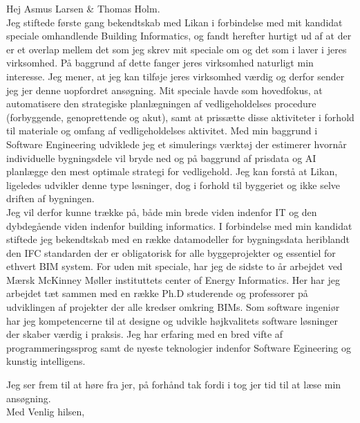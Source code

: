\documentclass[12pt,a4paper]{altacv}
\begin{document}
Hej Asmus Larsen \& Thomas Holm.
\\
\vspace{5mm}
Jeg stiftede første gang bekendtskab med Likan i forbindelse med mit kandidat speciale omhandlende Building Informatics, og fandt herefter hurtigt ud af at der er et overlap mellem det som jeg skrev mit speciale om og det som i laver i jeres virksomhed. 
På baggrund af dette fanger jeres virksomhed naturligt min interesse.
Jeg mener, at jeg kan tilføje jeres virksomhed værdig og derfor sender jeg jer denne uopfordret ansøgning.
\newline
Mit speciale havde som hovedfokus, at automatisere den strategiske planlægningen af vedligeholdelses procedure (forbyggende, genoprettende og akut), samt at prissætte disse aktiviteter i forhold til materiale og omfang af vedligeholdelses aktivitet.
Med min baggrund i Software Engineering udviklede jeg et simulerings værktøj der estimerer hvornår individuelle bygningsdele vil bryde ned og på baggrund af prisdata og AI planlægge den mest optimale strategi for vedligehold.
\vspace{5mm}
Jeg kan forstå at Likan, ligeledes udvikler denne type løsninger, dog i forhold til byggeriet og ikke selve driften af bygningen.
\\
Jeg vil derfor kunne trække på, både min brede viden indenfor IT og den dybdegående viden indenfor building informatics.
I forbindelse med min kandidat stiftede jeg bekendtskab med en række datamodeller for bygningsdata heriblandt den IFC standarden der er obligatorisk for alle byggeprojekter og essentiel for ethvert BIM system.
For uden mit speciale, har jeg de sidste to år arbejdet ved Mærsk McKinney Møller instituttets center of Energy Informatics. 
Her har jeg arbejdet tæt sammen med en række Ph.D studerende og professorer på udviklingen af projekter der alle kredser omkring BIMs.
Som software ingeniør har jeg kompetencerne til at designe og udvikle højkvalitets software løsninger der skaber værdig i praksis.
Jeg har erfaring med en bred vifte af programmeringssprog samt de nyeste teknologier indenfor Software Egineering og kunstig intelligens.

\vspace{5mm}
Jeg ser frem til at høre fra jer, på forhånd tak fordi i tog jer tid til at læse min ansøgning.
\\
\vspace{5mm}
Med Venlig hilsen,\\
\end{document}
